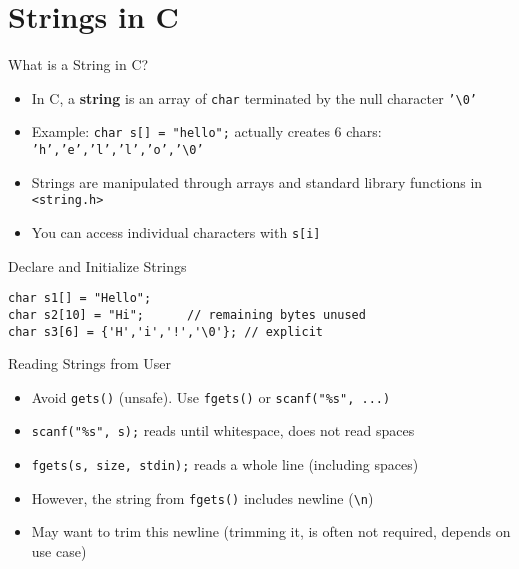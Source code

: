 \documentclass[12pt, aspectratio=169]{beamer}
\begin{document}
    \section{Strings in C}


    \begin{frame}{What is a String in C?}
        \begin{itemize}
            \item In C, a \textbf{string} is an array of \texttt{char} terminated by the null character \texttt{'\textbackslash0'}
            \item Example: \texttt{char s[] = "hello";} actually creates 6 chars: \texttt{'h','e','l','l','o','\textbackslash0'}
            \item Strings are manipulated through arrays and standard library functions in \texttt{<string.h>}
            \item You can access individual characters with \texttt{s[i]}
        \end{itemize}
    \end{frame}

    \begin{frame}[fragile]{Declare and Initialize Strings}
        \begin{verbatim}
char s1[] = "Hello";
char s2[10] = "Hi";      // remaining bytes unused
char s3[6] = {'H','i','!','\0'}; // explicit
        \end{verbatim}
    \end{frame}


    \begin{frame}[fragile]{Reading Strings from User}
        \begin{itemize}
            \item Avoid \texttt{gets()} (unsafe). Use \texttt{fgets()} or \texttt{scanf("\%s", ...)}
            \item \texttt{scanf("\%s", s);} reads until whitespace, does not read spaces
            \item \texttt{fgets(s, size, stdin);} reads a whole line (including spaces)
            \item However, the string from \texttt{fgets()} includes newline (\verb|\n|)
            \item May want to trim this newline (trimming it, is often not required, depends on use case)
        \end{itemize}
    \end{frame}
\end{document}
